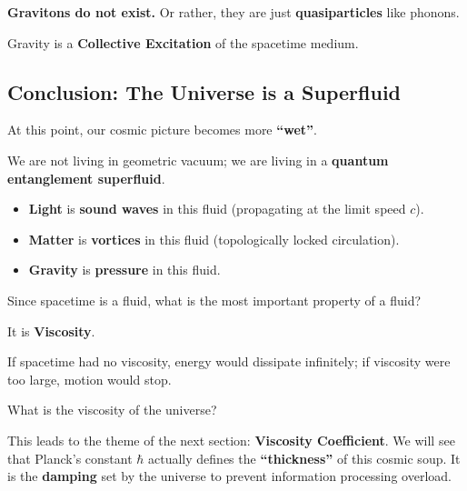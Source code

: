 \textbf{Gravitons do not exist.} Or rather, they are just \textbf{quasiparticles} like phonons.

Gravity is a \textbf{Collective Excitation} of the spacetime medium.

\subsection{Conclusion: The Universe is a Superfluid}

At this point, our cosmic picture becomes more \textbf{``wet''}.

We are not living in geometric vacuum; we are living in a \textbf{quantum entanglement superfluid}.

\begin{itemize}
\item \textbf{Light} is \textbf{sound waves} in this fluid (propagating at the limit speed $c$).

\item \textbf{Matter} is \textbf{vortices} in this fluid (topologically locked circulation).

\item \textbf{Gravity} is \textbf{pressure} in this fluid.
\end{itemize}

Since spacetime is a fluid, what is the most important property of a fluid?

It is \textbf{Viscosity}.

If spacetime had no viscosity, energy would dissipate infinitely; if viscosity were too large, motion would stop.

What is the viscosity of the universe?

This leads to the theme of the next section: \textbf{Viscosity Coefficient}. We will see that Planck's constant $\hbar$ actually defines the \textbf{``thickness''} of this cosmic soup. It is the \textbf{damping} set by the universe to prevent information processing overload.

